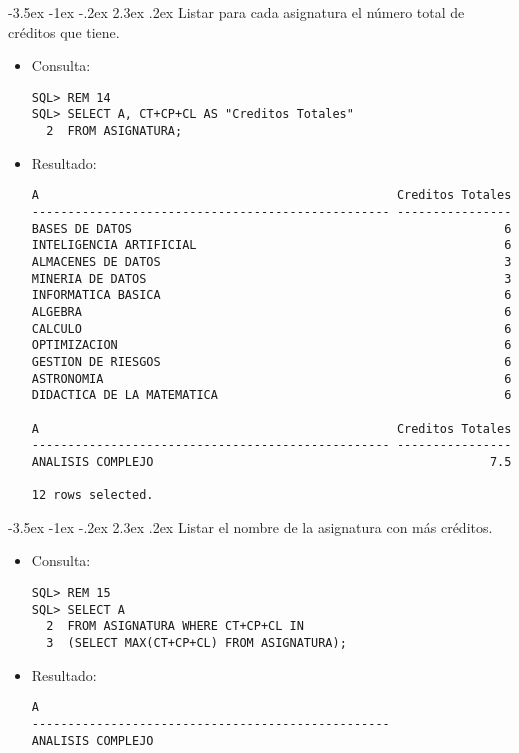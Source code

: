 \documentclass[11pt]{report}
\makeatletter
\renewcommand\chapter{\@startsection{chapter}{0}{\z@}%
    {-3.5ex \@plus -1ex \@minus -.2ex}%
    {2.3ex \@plus.2ex}%
    {\normalfont\Large\bfseries}}
\makeatother
\begin{document}
\chapter{Listar para cada asignatura el número total de créditos que tiene.}
\begin{itemize}
  \item Consulta:
  \begin{verbatim}
SQL> REM 14
SQL> SELECT A, CT+CP+CL AS "Creditos Totales"
  2  FROM ASIGNATURA;
  \end{verbatim}
  \item{Resultado:}
  \begin{verbatim}
A                                                  Creditos Totales             
-------------------------------------------------- ----------------             
BASES DE DATOS                                                    6             
INTELIGENCIA ARTIFICIAL                                           6             
ALMACENES DE DATOS                                                3             
MINERIA DE DATOS                                                  3             
INFORMATICA BASICA                                                6             
ALGEBRA                                                           6             
CALCULO                                                           6             
OPTIMIZACION                                                      6             
GESTION DE RIESGOS                                                6             
ASTRONOMIA                                                        6             
DIDACTICA DE LA MATEMATICA                                        6             

A                                                  Creditos Totales             
-------------------------------------------------- ----------------             
ANALISIS COMPLEJO                                               7.5             

12 rows selected.                                                                             
  \end{verbatim}
\end{itemize}

\chapter{Listar el nombre de la asignatura con más créditos.}
\begin{itemize}
  \item Consulta:
  \begin{verbatim}
SQL> REM 15
SQL> SELECT A
  2  FROM ASIGNATURA WHERE CT+CP+CL IN
  3  (SELECT MAX(CT+CP+CL) FROM ASIGNATURA);
  \end{verbatim}
  \item{Resultado:}
  \begin{verbatim}
A                                                                               
--------------------------------------------------                              
ANALISIS COMPLEJO                                                                        
  \end{verbatim}
\end{itemize}
\end{document}
